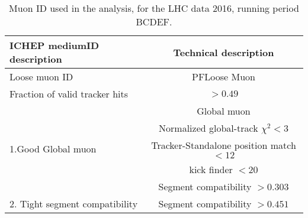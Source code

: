 \begin{table}[!tpb]
\caption{Muon ID used in the analysis, for the LHC data 2016, running period BCDEF.  \label{tbl:ICHEPMedID}}
\label{tab:antil}
\begin{center}
\begin{tabular}{|l|c|}   
\hline
ICHEP mediumID description                    &  Technical description\\\hline
Loose muon ID                               & PFLoose Muon\\\hline
Fraction of valid tracker hits           & $>0.49$ \\\hline
\multirow{5}{*}{1.Good Global muon}                      &Global muon\\\cline{2-2}
                                                                        &Normalized global-track $\chi^{2}<3$\\\cline{2-2}
                                                                        &Tracker-Standalone position match $< 12$\\\cline{2-2}
                                                                        &kick finder $< 20$ \\\cline{2-2}
                                                                        &Segment compatibility $> 0.303$ \\\hline                                                                       
\hline
2. Tight segment compatibility      & Segment compatibility $>0.451$\\\hline
\end{tabular}
\end{center}
\end{table}



